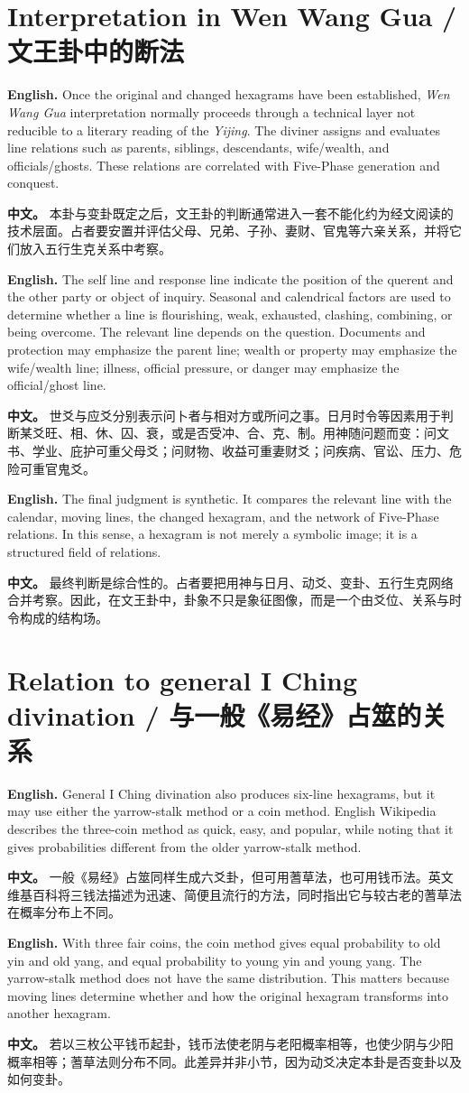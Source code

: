 \documentclass[11pt]{article}
\newcommand{\EN}[1]{\textcolor{labelgray}{\textbf{English.}} #1}
\newcommand{\CN}[1]{\textcolor{labelgray}{\textbf{中文。}} #1}
\newcommand{\bipar}[2]{\EN{#1}\par\CN{#2}\par\medskip}
\begin{document}
\section{Interpretation in Wen Wang Gua / 文王卦中的断法}
\bipar{Once the original and changed hexagrams have been established, \textit{Wen Wang Gua} interpretation normally proceeds through a technical layer not reducible to a literary reading of the \textit{Yijing}. The diviner assigns and evaluates line relations such as parents, siblings, descendants, wife/wealth, and officials/ghosts. These relations are correlated with Five-Phase generation and conquest.}{本卦与变卦既定之后，文王卦的判断通常进入一套不能化约为经文阅读的技术层面。占者要安置并评估父母、兄弟、子孙、妻财、官鬼等六亲关系，并将它们放入五行生克关系中考察。}
\bipar{The self line and response line indicate the position of the querent and the other party or object of inquiry. Seasonal and calendrical factors are used to determine whether a line is flourishing, weak, exhausted, clashing, combining, or being overcome. The relevant line depends on the question. Documents and protection may emphasize the parent line; wealth or property may emphasize the wife/wealth line; illness, official pressure, or danger may emphasize the official/ghost line.}{世爻与应爻分别表示问卜者与相对方或所问之事。日月时令等因素用于判断某爻旺、相、休、囚、衰，或是否受冲、合、克、制。用神随问题而变：问文书、学业、庇护可重父母爻；问财物、收益可重妻财爻；问疾病、官讼、压力、危险可重官鬼爻。}
\bipar{The final judgment is synthetic. It compares the relevant line with the calendar, moving lines, the changed hexagram, and the network of Five-Phase relations. In this sense, a hexagram is not merely a symbolic image; it is a structured field of relations.}{最终判断是综合性的。占者要把用神与日月、动爻、变卦、五行生克网络合并考察。因此，在文王卦中，卦象不只是象征图像，而是一个由爻位、关系与时令构成的结构场。}

\section{Relation to general I Ching divination / 与一般《易经》占筮的关系}
\bipar{General I Ching divination also produces six-line hexagrams, but it may use either the yarrow-stalk method or a coin method. English Wikipedia describes the three-coin method as quick, easy, and popular, while noting that it gives probabilities different from the older yarrow-stalk method.}{一般《易经》占筮同样生成六爻卦，但可用蓍草法，也可用钱币法。英文维基百科将三钱法描述为迅速、简便且流行的方法，同时指出它与较古老的蓍草法在概率分布上不同。}
\bipar{With three fair coins, the coin method gives equal probability to old yin and old yang, and equal probability to young yin and young yang. The yarrow-stalk method does not have the same distribution. This matters because moving lines determine whether and how the original hexagram transforms into another hexagram.}{若以三枚公平钱币起卦，钱币法使老阴与老阳概率相等，也使少阴与少阳概率相等；蓍草法则分布不同。此差异并非小节，因为动爻决定本卦是否变卦以及如何变卦。}
\end{document}
